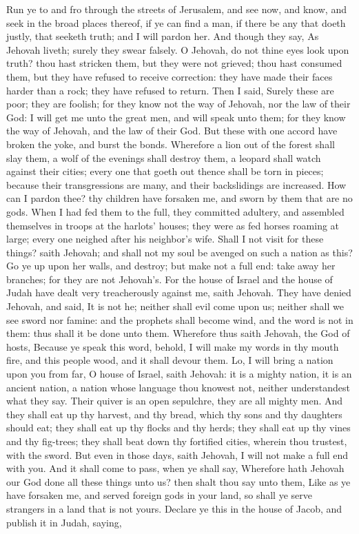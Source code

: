 Run ye to and fro through the streets of Jerusalem, and see now, and know, and seek in the broad places thereof, if ye can find a man, if there be any that doeth justly, that seeketh truth; and I will pardon her. And though they say, As Jehovah liveth; surely they swear falsely. O Jehovah, do not thine eyes look upon truth? thou hast stricken them, but they were not grieved; thou hast consumed them, but they have refused to receive correction: they have made their faces harder than a rock; they have refused to return.  Then I said, Surely these are poor; they are foolish; for they know not the way of Jehovah, nor the law of their God: I will get me unto the great men, and will speak unto them; for they know the way of Jehovah, and the law of their God. But these with one accord have broken the yoke, and burst the bonds. Wherefore a lion out of the forest shall slay them, a wolf of the evenings shall destroy them, a leopard shall watch against their cities; every one that goeth out thence shall be torn in pieces; because their transgressions are many, and their backslidings are increased.  How can I pardon thee? thy children have forsaken me, and sworn by them that are no gods. When I had fed them to the full, they committed adultery, and assembled themselves in troops at the harlots’ houses; they were as fed horses roaming at large; every one neighed after his neighbor’s wife. Shall I not visit for these things? saith Jehovah; and shall not my soul be avenged on such a nation as this?  Go ye up upon her walls, and destroy; but make not a full end: take away her branches; for they are not Jehovah’s. For the house of Israel and the house of Judah have dealt very treacherously against me, saith Jehovah. They have denied Jehovah, and said, It is not he; neither shall evil come upon us; neither shall we see sword nor famine: and the prophets shall become wind, and the word is not in them: thus shall it be done unto them.  Wherefore thus saith Jehovah, the God of hosts, Because ye speak this word, behold, I will make my words in thy mouth fire, and this people wood, and it shall devour them. Lo, I will bring a nation upon you from far, O house of Israel, saith Jehovah: it is a mighty nation, it is an ancient nation, a nation whose language thou knowest not, neither understandest what they say. Their quiver is an open sepulchre, they are all mighty men. And they shall eat up thy harvest, and thy bread, which thy sons and thy daughters should eat; they shall eat up thy flocks and thy herds; they shall eat up thy vines and thy fig-trees; they shall beat down thy fortified cities, wherein thou trustest, with the sword. But even in those days, saith Jehovah, I will not make a full end with you.  And it shall come to pass, when ye shall say, Wherefore hath Jehovah our God done all these things unto us? then shalt thou say unto them, Like as ye have forsaken me, and served foreign gods in your land, so shall ye serve strangers in a land that is not yours.  Declare ye this in the house of Jacob, and publish it in Judah, saying, 